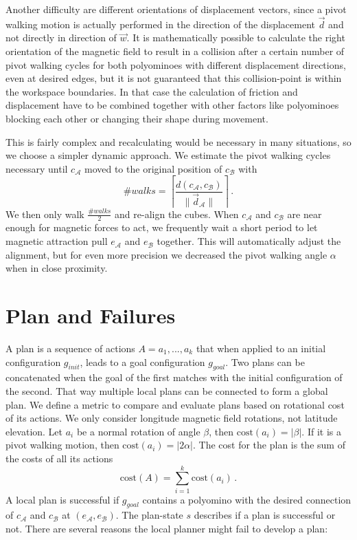 Another difficulty are different orientations of displacement vectors, since a pivot walking motion is actually performed in the direction of the displacement $\vec{d}$ and not directly in direction of $\vec{w}$.
It is mathematically possible to calculate the right orientation of the magnetic field to result in a collision after a certain number of pivot walking cycles for both polyominoes with different displacement directions, even at desired edges, but it is not guaranteed that this collision-point is within the workspace boundaries.
In that case the calculation of friction and displacement have to be combined together with other factors like polyominoes blocking each other or changing their shape during movement.

This is fairly complex and recalculating would be necessary in many situations, so we choose a simpler dynamic approach.
We estimate the pivot walking cycles necessary until $c_\mathcal{A}$ moved to the original position of $c_\mathcal{B}$ with
\begin{equation}
\#\textit{walks} = \left\lceil \frac{d(c_\mathcal{A}, c_\mathcal{B})}{\lVert \vec{d}_\mathcal{A} \rVert} \right\rceil \,.
\end{equation}
We then only walk $\frac{\#\textit{walks}}{2}$ and re-align the cubes.
When $c_\mathcal{A}$ and $c_\mathcal{B}$ are near enough for magnetic forces to act, we frequently wait a short period to let magnetic attraction pull $e_\mathcal{A}$ and $e_\mathcal{B}$ together.
This will automatically adjust the alignment, but for even more precision we decreased the pivot walking angle $\alpha$ when in close proximity.

\section{Plan and Failures}
\label{sec:plan}

A plan is a sequence of actions $A = a_1, ... , a_k$ that when applied to an initial configuration $g_\textit{init}$, leads to a goal configuration $g_\textit{goal}$.
Two plans can be concatenated when the goal of the first matches with the initial configuration of the second.
That way multiple local plans can be connected to form a global plan.
We define a metric to compare and evaluate plans based on rotational cost of its actions.
We only consider longitude magnetic field rotations, not latitude elevation.
Let $a_i$ be a normal rotation of angle $\beta$, then $\text{cost}(a_i) = |\beta|$.
If it is a pivot walking motion, then $\text{cost}(a_i) = |2\alpha|$.
The cost for the plan is the sum of the costs of all its actions
\begin{equation}
\text{cost}(A) = \sum_{i=1}^{k} \text{cost}(a_i) \,.
\end{equation}
A local plan is successful if $g_\textit{goal}$ contains a polyomino with the desired connection of $c_\mathcal{A}$ and $c_\mathcal{B}$ at $(e_\mathcal{A}, e_\mathcal{B})$.
The plan-state $s$ describes if a plan is successful or not.
There are several reasons the local planner might fail to develop a plan:

